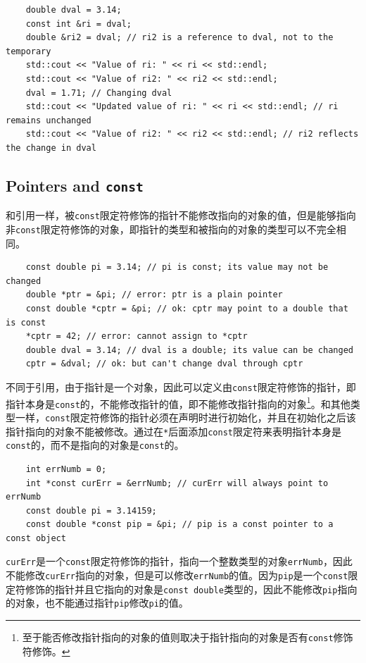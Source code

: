 \begin{verbatim}
    double dval = 3.14;
    const int &ri = dval;
    double &ri2 = dval; // ri2 is a reference to dval, not to the temporary
    std::cout << "Value of ri: " << ri << std::endl;
    std::cout << "Value of ri2: " << ri2 << std::endl;
    dval = 1.71; // Changing dval
    std::cout << "Updated value of ri: " << ri << std::endl; // ri remains unchanged
    std::cout << "Value of ri2: " << ri2 << std::endl; // ri2 reflects the change in dval
\end{verbatim}

\subsection{Pointers and \texttt{const}}\label{sec:cpp-const-pointer}
和引用一样，被\texttt{const}限定符修饰的指针不能修改指向的对象的值，但是能够指向非\texttt{const}限定符修饰的对象，即指针的类型和被指向的对象的类型可以不完全相同。

\begin{verbatim}
    const double pi = 3.14; // pi is const; its value may not be changed
    double *ptr = &pi; // error: ptr is a plain pointer
    const double *cptr = &pi; // ok: cptr may point to a double that is const
    *cptr = 42; // error: cannot assign to *cptr
    double dval = 3.14; // dval is a double; its value can be changed
    cptr = &dval; // ok: but can't change dval through cptr
\end{verbatim}

不同于引用，由于指针是一个对象，因此可以定义由\texttt{const}限定符修饰的指针，即指针本身是\texttt{const}的，不能修改指针的值，即不能修改指针指向的对象\footnote{至于能否修改指针指向的对象的值则取决于指针指向的对象是否有\texttt{const}修饰符修饰。}。和其他类型一样，\texttt{const}限定符修饰的指针必须在声明时进行初始化，并且在初始化之后该指针指向的对象不能被修改。通过在\texttt{*}后面添加\texttt{const}限定符来表明指针本身是\texttt{const}的，而不是指向的对象是\texttt{const}的。

\begin{verbatim}
    int errNumb = 0;
    int *const curErr = &errNumb; // curErr will always point to errNumb
    const double pi = 3.14159;
    const double *const pip = &pi; // pip is a const pointer to a const object
\end{verbatim}

\texttt{curErr}是一个\texttt{const}限定符修饰的指针，指向一个整数类型的对象\texttt{errNumb}，因此不能修改\texttt{curErr}指向的对象，但是可以修改\texttt{errNumb}的值。因为\texttt{pip}是一个\texttt{const}限定符修饰的指针并且它指向的对象是\texttt{const double}类型的，因此不能修改\texttt{pip}指向的对象，也不能通过指针\texttt{pip}修改\texttt{pi}的值。

